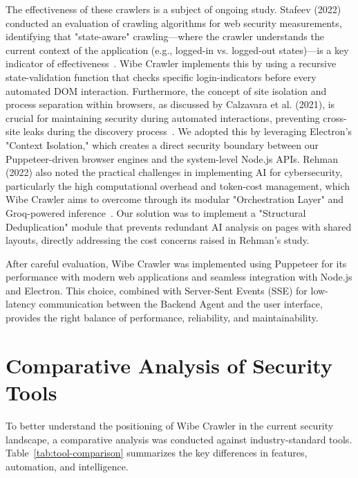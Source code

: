 \documentclass[12pt,oneside,a4paper]{book}
\begin{document}
The effectiveness of these crawlers is a subject of ongoing study. Stafeev (2022) conducted an evaluation of crawling algorithms for web security measurements, identifying that "state-aware" crawling---where the crawler understands the current context of the application (e.g., logged-in vs. logged-out states)---is a key indicator of effectiveness~\cite{stafeev2022}. Wibe Crawler implements this by using a recursive state-validation function that checks specific login-indicators before every automated DOM interaction. Furthermore, the concept of site isolation and process separation within browsers, as discussed by Calzavara et al. (2021), is crucial for maintaining security during automated interactions, preventing cross-site leaks during the discovery process~\cite{calzavara}. We adopted this by leveraging Electron’s "Context Isolation," which creates a direct security boundary between our Puppeteer-driven browser engines and the system-level Node.js APIs. Rehman (2022) also noted the practical challenges in implementing AI for cybersecurity, particularly the high computational overhead and token-cost management, which Wibe Crawler aims to overcome through its modular "Orchestration Layer" and Groq-powered inference~\cite{rehman2022}. Our solution was to implement a "Structural Deduplication" module that prevents redundant AI analysis on pages with shared layouts, directly addressing the cost concerns raised in Rehman’s study.

After careful evaluation, Wibe Crawler was implemented using Puppeteer for its performance with modern web applications and seamless integration with Node.js and Electron. This choice, combined with Server-Sent Events (SSE) for low-latency communication between the Backend Agent and the user interface, provides the right balance of performance, reliability, and maintainability.

\section{Comparative Analysis of Security Tools}

To better understand the positioning of Wibe Crawler in the current security landscape, a comparative analysis was conducted against industry-standard tools. Table~\ref{tab:tool-comparison} summarizes the key differences in features, automation, and intelligence.
\end{document}
